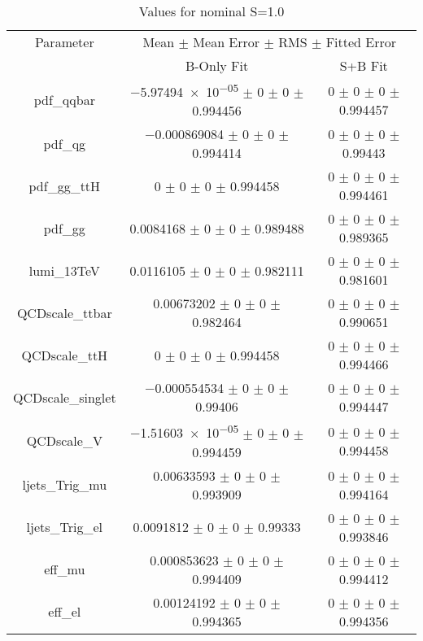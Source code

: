 \begin{table}
\centering
\caption{Values for nominal S=1.0}
\begin{tabular}{ccc}
\toprule
Parameter & \multicolumn{2}{c}{Mean $\pm$ Mean Error $\pm$ RMS $\pm$ Fitted Error}\\
 & B-Only Fit & S+B Fit\\
\midrule
pdf\_qqbar & \num{-5.97494e-05} $\pm$ \num{0} $\pm$ \num{0} $\pm$ \num{0.994456} & \num{0} $\pm$ \num{0} $\pm$ \num{0} $\pm$ \num{0.994457}\\
pdf\_qg & \num{-0.000869084} $\pm$ \num{0} $\pm$ \num{0} $\pm$ \num{0.994414} & \num{0} $\pm$ \num{0} $\pm$ \num{0} $\pm$ \num{0.99443}\\
pdf\_gg\_ttH & \num{0} $\pm$ \num{0} $\pm$ \num{0} $\pm$ \num{0.994458} & \num{0} $\pm$ \num{0} $\pm$ \num{0} $\pm$ \num{0.994461}\\
pdf\_gg & \num{0.0084168} $\pm$ \num{0} $\pm$ \num{0} $\pm$ \num{0.989488} & \num{0} $\pm$ \num{0} $\pm$ \num{0} $\pm$ \num{0.989365}\\
lumi\_13TeV & \num{0.0116105} $\pm$ \num{0} $\pm$ \num{0} $\pm$ \num{0.982111} & \num{0} $\pm$ \num{0} $\pm$ \num{0} $\pm$ \num{0.981601}\\
QCDscale\_ttbar & \num{0.00673202} $\pm$ \num{0} $\pm$ \num{0} $\pm$ \num{0.982464} & \num{0} $\pm$ \num{0} $\pm$ \num{0} $\pm$ \num{0.990651}\\
QCDscale\_ttH & \num{0} $\pm$ \num{0} $\pm$ \num{0} $\pm$ \num{0.994458} & \num{0} $\pm$ \num{0} $\pm$ \num{0} $\pm$ \num{0.994466}\\
QCDscale\_singlet & \num{-0.000554534} $\pm$ \num{0} $\pm$ \num{0} $\pm$ \num{0.99406} & \num{0} $\pm$ \num{0} $\pm$ \num{0} $\pm$ \num{0.994447}\\
QCDscale\_V & \num{-1.51603e-05} $\pm$ \num{0} $\pm$ \num{0} $\pm$ \num{0.994459} & \num{0} $\pm$ \num{0} $\pm$ \num{0} $\pm$ \num{0.994458}\\
ljets\_Trig\_mu & \num{0.00633593} $\pm$ \num{0} $\pm$ \num{0} $\pm$ \num{0.993909} & \num{0} $\pm$ \num{0} $\pm$ \num{0} $\pm$ \num{0.994164}\\
ljets\_Trig\_el & \num{0.0091812} $\pm$ \num{0} $\pm$ \num{0} $\pm$ \num{0.99333} & \num{0} $\pm$ \num{0} $\pm$ \num{0} $\pm$ \num{0.993846}\\
eff\_mu & \num{0.000853623} $\pm$ \num{0} $\pm$ \num{0} $\pm$ \num{0.994409} & \num{0} $\pm$ \num{0} $\pm$ \num{0} $\pm$ \num{0.994412}\\
eff\_el & \num{0.00124192} $\pm$ \num{0} $\pm$ \num{0} $\pm$ \num{0.994365} & \num{0} $\pm$ \num{0} $\pm$ \num{0} $\pm$ \num{0.994356}\\

\end{tabular}
\end{table}
